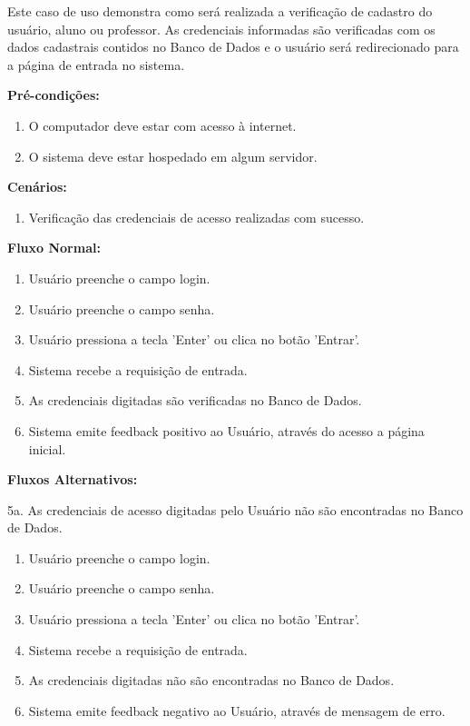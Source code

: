 \documentclass[graduacao,brazil]{ThesisPUC}
\begin{document}
Este caso de uso demonstra como ser\'{a} realizada a verifica\c{c}\~{a}o de cadastro do usu\'{a}rio, aluno ou professor.
As credenciais informadas s\~{a}o verificadas com os dados cadastrais contidos no Banco de Dados e o usuário ser\'{a}
redirecionado para a p\'{a}gina de entrada no sistema.


\textbf{Pr\'{e}-condi\c{c}\~{o}es:}

\begin{enumerate}
  \item O computador deve estar com acesso \`{a} internet.
  \item O sistema deve estar hospedado em algum servidor.
\end{enumerate}

\textbf{Cenários:}

\begin{enumerate}
  \item Verifica\c{c}\~{a}o das credenciais de acesso realizadas com sucesso.
\end{enumerate}

\textbf{Fluxo Normal:}

\begin{enumerate}
  \item Usu\'{a}rio preenche o campo login.
  \item Usu\'{a}rio preenche o campo senha.
  \item Usu\'{a}rio pressiona a tecla 'Enter' ou clica no bot\~{a}o 'Entrar'.
  \item Sistema recebe a requisi\c{c}\~{a}o de entrada.
  \item As credenciais digitadas s\~{a}o verificadas no Banco de Dados.
  \item Sistema emite feedback positivo ao Usu\'{a}rio, atrav\'{e}s do acesso a p\'{a}gina inicial.
\end{enumerate}

\textbf{Fluxos Alternativos:}

5a. As credenciais de acesso digitadas pelo Usu\'{a}rio n\~{a}o s\~{a}o encontradas no Banco de Dados.

\begin{enumerate}
  \item Usu\'{a}rio preenche o campo login.
  \item Usu\'{a}rio preenche o campo senha.
  \item Usu\'{a}rio pressiona a tecla 'Enter' ou clica no bot\~{a}o 'Entrar'.
  \item Sistema recebe a requisi\c{c}\~{a}o de entrada.
  \item As credenciais digitadas n\~{a}o s\~{a}o encontradas no Banco de Dados.
  \item Sistema emite feedback negativo ao Usu\'{a}rio, atrav\'{e}s de mensagem de erro.
\end{enumerate}
\end{document}
